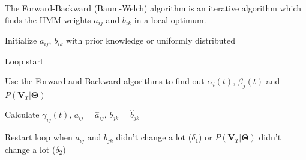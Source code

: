 \begin{minipage}{11cm}
      The Forward-Backward (Baum-Welch) algorithm is an iterative algorithm which finds the HMM 
      weights $a_{ij}$ and $b_{ik}$ in a local optimum.
      \begin{aufzaehlung}
        \item Initialize $a_{ij}$, $b_{ik}$ with prior knowledge or uniformly distributed
        \item Loop start
        \item Use the Forward and Backward algorithms to find out $\alpha_i(t)$, $\beta_j(t)$ and $P(\bm V_T|\bm \Theta)$
        \item Calculate $\gamma_{ij}(t)$, $a_{ij} = \hat a_{ij}$, $b_{jk} = \hat b_{jk}$
        \item Restart loop when $a_{ij}$ and $b_{jk}$ didn't change a lot ($\delta_1$) or 
        $P(\bm V_T|\bm \Theta)$ didn't change a lot ($\delta_2$)
      \end{aufzaehlung}
      
  \end{minipage}\hspace{5mm}
